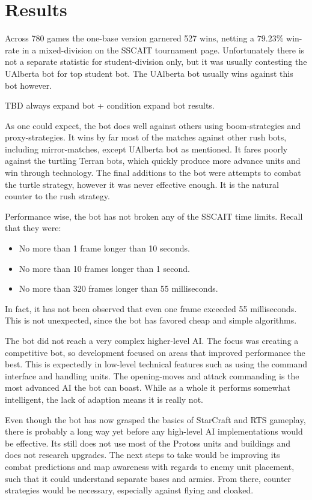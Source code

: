 \chapter{Results}
\label{ch:results}
Across 780 games the one-base version garnered 527 wins, netting a $79.23\%$ win-rate in a mixed-division on the SSCAIT tournament page. Unfortunately there is not a separate statistic for student-division only, but it was usually contesting the UAlberta bot for top student bot. The UAlberta bot usually wins against this bot however.

TBD always expand bot + condition expand bot results.

As one could expect, the bot does well against others using boom-strategies and proxy-strategies. It wins by far most of the matches against other rush bots, including mirror-matches, except UAlberta bot as mentioned. It fares poorly against the turtling Terran bots, which quickly produce more advance units and win through technology. The final additions to the bot were attempts to combat the turtle strategy, however it was never effective enough. It is the natural counter to the rush strategy.

Performance wise, the bot has not broken any of the SSCAIT time limits. Recall that they were:
\begin{itemize}
	\item No more than 1 frame longer than 10 seconds.
	\item No more than 10 frames longer than 1 second.
	\item No more than 320 frames longer than 55 milliseconds.
\end{itemize}
In fact, it has not been observed that even one frame exceeded 55 milliseconds. This is not unexpected, since the bot has favored cheap and simple algorithms.

The bot did not reach a very complex higher-level AI. The focus was creating a competitive bot, so development focused on areas that improved performance the best. This is expectedly in low-level technical features such as using the command interface and handling units. The opening-moves and attack commanding is the most advanced AI the bot can boast.  While as a whole it performs somewhat intelligent, the lack of adaption means it is really not.

Even though the bot has now grasped the basics of StarCraft and RTS gameplay, there is probably a long way yet before any high-level AI implementations would be effective. Its still does not use most of the Protoss units and buildings and does not research upgrades. The next steps to take would be improving its combat predictions and map awareness with regards to enemy unit placement, such that it could understand separate bases and armies. From there, counter strategies would be necessary, especially against flying and cloaked.

